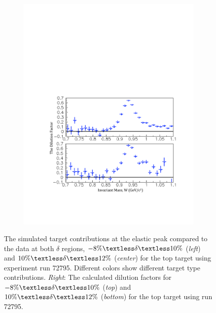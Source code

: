 \documentclass[12pt]{article}
\begin{document}
\begin{figure}[htbp]
\begin{subfigure}[htbp]{0.31\textwidth}
                \label{trg_cont1012}
        \end{subfigure}   
           \begin{subfigure}[htbp]{0.34\textwidth}
                \centering
               \includegraphics[width=\textwidth]{reldf}
                \label{reldf}
        \end{subfigure}         
\vspace{-0.4cm}         
\caption{The simulated target contributions at the elastic peak compared to the data at both $\delta$ regions,   $-8\% \textless \delta \textless 10\%$ (\emph{left}) and $10\% \textless \delta \textless 12\%$ (\emph{center}) for the top target using experiment run 72795. Different colors show different target type contributions. \emph{Right}: The calculated dilution factors for $-8\% \textless \delta \textless 10\%$ (\emph{top}) and $10\% \textless \delta \textless12\%$ (\emph{bottom}) for the top target using run 72795.}
\label{trg_cont}                  
\end{figure}
\end{document}
